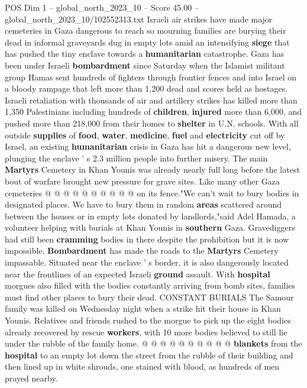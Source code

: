 \begin{textsample}{POS Dim 1 – global\_north\_2023\_10 – Score 45.00 – global\_north\_2023\_10/102552313.txt}  \label{ex:f1_pos_315}
Israeli air strikes have made major cemeteries in Gaza dangerous to reach so mourning families are burying their dead in informal graveyards dug in empty lots amid an intensifying \textbf{siege} that has pushed the tiny enclave towards a \textbf{humanitarian} catastrophe.
Gaza has been under Israeli \textbf{bombardment} since Saturday when the Islamist militant group Hamas sent hundreds of fighters through frontier fences and into Israel on a bloody rampage that left more than 1,200 dead and scores held as hostages.
Israeli retaliation with thousands of air and artillery strikes has killed more than 1,350 Palestinians including hundreds of \textbf{children}, \textbf{injured} more than 6,000, and pushed more than 218,000 from their homes to \textbf{shelter} in U.N. schools.
With all outside \textbf{supplies} of \textbf{food}, \textbf{water}, \textbf{medicine}, \textbf{fuel} and \textbf{electricity} cut off by Israel, an existing \textbf{humanitarian} crisis in Gaza has hit a dangerous new level, plunging the enclave ' s 2.3 million people into further misery.
The main \textbf{Martyrs} Cemetery in Khan Younis was already nearly full long before the latest bout of warfare brought new pressure for grave sites.
Like many other Gaza cemeteries @ @ @ @ @ @ @ @ @ @ on its fence."We can't wait to bury bodies in designated places.
We have to bury them in random \textbf{areas} scattered around between the houses or in empty lots donated by landlords,"said Adel Hamada, a volunteer helping with burials at Khan Younis in \textbf{southern} Gaza.
Gravediggers had still been \textbf{cramming} bodies in there despite the prohibition but it is now impossible. \textbf{Bombardment} has made the roads to the \textbf{Martyrs} Cemetery impassable.
Situated near the enclave ' s border, it is also dangerously located near the frontlines of an expected Israeli \textbf{ground} assault.
With \textbf{hospital} morgues also filled with the bodies constantly arriving from bomb sites, families must find other places to bury their dead.
CONSTANT BURIALS The Samour family was killed on Wednesday night when a strike hit their house in Khan Younis.
Relatives and friends rushed to the morgue to pick up the eight bodies already recovered by rescue \textbf{workers}, with 10 more bodies believed to still lie under the rubble of the family home. @ @ @ @ @ @ @ @ @ @ \textbf{blankets} from the \textbf{hospital} to an empty lot down the street from the rubble of their building and then lined up in white shrouds, one stained with blood, as hundreds of men prayed nearby.

\end{textsample}

